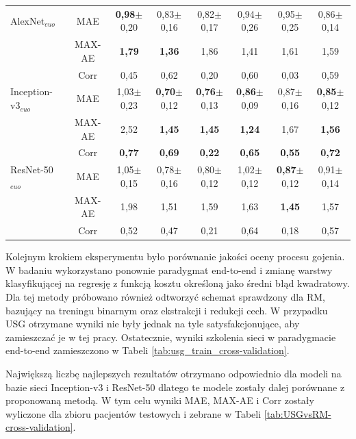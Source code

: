 \begin{table}[h]
\begin{tabular}{lc||c|c|c|c|c|c}
		AlexNet$_{euo}$ & MAE & \textbf{0,98}$\pm$0,20 & 0,83$\pm$0,16 & 0,82$\pm$0,17 & 0,94$\pm$0,26 & 0,95$\pm$0,25 & 0,86$\pm$0,14  \\
		& MAX-AE & \textbf{1,79} & \textbf{1,36} & 1,86 & 1,41 & 1,61 & 1,59 \\ 
		& Corr & 0,45 & 0,62 & 0,20 & 0,60 & 0,03 & 0,59 \\ \hline
		Inception-v3$_{euo}$ & MAE & 1,03$\pm$0,23 & \textbf{0,70}$\pm$0,12 & \textbf{0,76}$\pm$0,13 & \textbf{0,86}$\pm$0,09 & 0,87$\pm$0,16 & \textbf{0,85}$\pm$0,12  \\
		& MAX-AE & 2,52 & \textbf{1,45} & \textbf{1,45} & \textbf{1,24} & 1,67 & \textbf{1,56} \\ 
		& Corr & \textbf{0,77} & \textbf{0,69} & \textbf{0,22} & \textbf{0,65} & \textbf{0,55} & \textbf{0,72} \\ \hline
		ResNet-50$_{euo}$ & MAE & 1,05$\pm$0,15 & 0,78$\pm$0,16 & 0,80$\pm$0,12 & 1,02$\pm$0,12 & \textbf{0,87}$\pm$0,12 & 0,91$\pm$0,14 \\
		& MAX-AE & 1,98 & 1,51 & 1,59 & 1,63 & \textbf{1,45} & 1,57 \\
		& Corr & 0,52 & 0,47 & 0,21 & 0,64 & 0,18 & 0,57 \\ 
	\end{tabular}
\end{table}
\renewcommand{\arraystretch}{1}

Kolejnym krokiem eksperymentu było porównanie jakości oceny procesu gojenia. W badaniu wykorzystano ponownie paradygmat end-to-end i zmianę warstwy klasyfikującej na regresję z funkcją kosztu określoną jako średni błąd kwadratowy. Dla tej metody próbowano również odtworzyć schemat sprawdzony dla RM, bazujący na treningu binarnym oraz ekstrakcji i redukcji cech. W przypadku USG otrzymane wyniki nie były jednak na tyle satysfakcjonujące, aby zamieszczać je w tej pracy. Ostatecznie, wyniki szkolenia sieci w paradygmacie end-to-end zamieszczono w Tabeli \ref{tab:usg_train_cross-validation}.

Największą liczbę najlepszych rezultatów otrzymano odpowiednio dla modeli na bazie sieci Inception-v3 i ResNet-50 dlatego te modele zostały dalej porównane z proponowaną metodą. W tym celu wyniki MAE, MAX-AE i Corr zostały wyliczone dla zbioru pacjentów testowych i zebrane w Tabeli \ref{tab:USGvsRM-cross-validation}.

